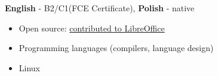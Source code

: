 \documentclass[9pt]{developercv} %
\begin{document}
\vspace{-7 pt}
    \vspace{-6pt}
    
    \hspace{26mm} \textbf{English} - B2/C1\hspace{3pt}(FCE Certificate), \textbf{ Polish} - native

\vspace{-5 pt}
    \vspace{-6pt}
    
    \begin{itemize}[topsep=0pt,parsep=0pt,partopsep=0pt,leftmargin=26mm]
    \item Open source: \underline{contributed to LibreOffice}
    \item Programming languages (compilers, language design)
    \item Linux
\end{itemize}

\vspace*{\fill}


\end{document}
